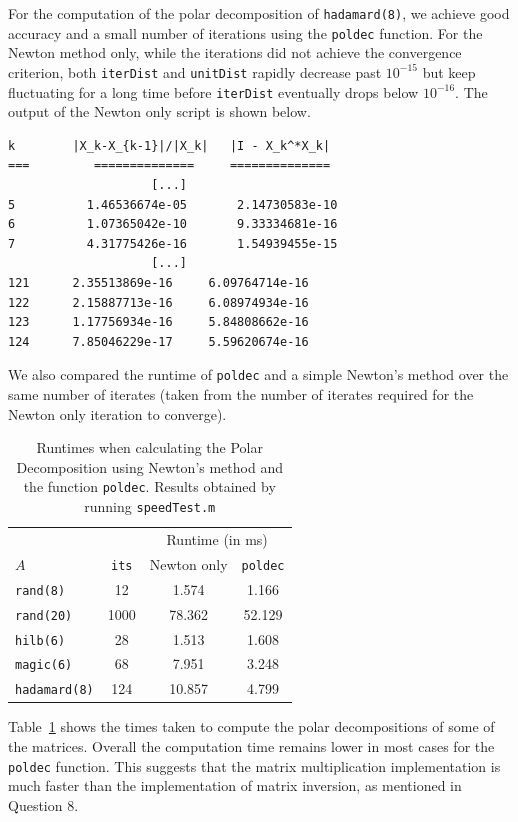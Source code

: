 \documentclass[10pt, A4paper]{article}
\begin{document}
For the computation of the polar decomposition of \texttt{hadamard(8)}, 
we achieve good accuracy and a small number of iterations using the 
\texttt{poldec} function. For the Newton method only, while the 
iterations did not achieve the convergence criterion, both 
\texttt{iterDist} and \texttt{unitDist} rapidly decrease past 
$10^{-15}$ but keep fluctuating for a long time before 
\texttt{iterDist} eventually drops below $10^{-16}$. The output of the 
Newton only script is shown below.
\begin{verbatim}
k   	 |X_k-X_{k-1}|/|X_k|   |I - X_k^*X_k|
=== 	    ==============     ==============
                    [...]
5	       1.46536674e-05	    2.14730583e-10
6	       1.07365042e-10	    9.33334681e-16
7	       4.31775426e-16	    1.54939455e-15
                    [...]
121	     2.35513869e-16	    6.09764714e-16
122	     2.15887713e-16	    6.08974934e-16
123      1.17756934e-16	    5.84808662e-16
124      7.85046229e-17	    5.59620674e-16
\end{verbatim}

We also compared the runtime of \texttt{poldec} and a simple Newton's 
method over the same number of iterates (taken from the number of 
iterates required for the Newton only iteration to converge).
\begin{table}[b]
	\centering
	\begin{tabular}{ l c c c }
		\toprule
		& &\multicolumn{2}{c}{Runtime (in ms)} \\
		\cmidrule(lr){3-4}
		$A$ & \texttt{its} & Newton only & \texttt{poldec} \\
		\midrule
		\texttt{rand(8)}     & 12   & 1.574  & 1.166  \\
		\texttt{rand(20)}    & 1000 & 78.362 & 52.129 \\
		\texttt{hilb(6)}     & 28   & 1.513  & 1.608  \\
		\texttt{magic(6)}    & 68   & 7.951  & 3.248  \\
		\texttt{hadamard(8)} & 124  & 10.857 & 4.799  \\
		\bottomrule
	\end{tabular}
	\caption{
	Runtimes when calculating the Polar Decomposition using 
	Newton's method and the function \texttt{poldec}. Results obtained 
	by running \texttt{speedTest.m}
	\label{tab:runtimes}}
\end{table}
Table~\ref{tab:runtimes} shows the times taken to compute the polar 
decompositions of some of the matrices. Overall the computation time 
remains lower in most cases for the \texttt{poldec} function.
This suggests that the matrix multiplication implementation is 
much faster than the implementation of matrix inversion, as mentioned 
in Question 8.
\end{document}
